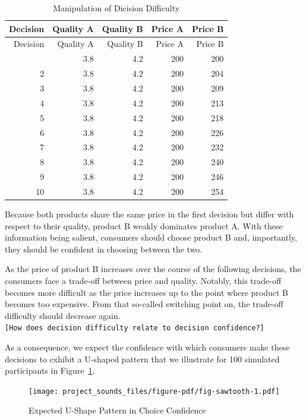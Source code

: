 \documentclass[
  a4paper,
]{scrreprt}
\begin{document}
\hypertarget{tbl-stimuli}{}
\begin{longtable}[]{@{}rrrrr@{}}
\caption{\label{tbl-stimuli}Manipulation of Dicision
Difficulty}\tabularnewline
\toprule\noalign{}
Decision & Quality A & Quality B & Price A & Price B \\
\midrule\noalign{}
\endfirsthead
\toprule\noalign{}
Decision & Quality A & Quality B & Price A & Price B \\
\midrule\noalign{}
\endhead
\bottomrule\noalign{}
\endlastfoot
1 & 3.8 & 4.2 & 200 & 200 \\
2 & 3.8 & 4.2 & 200 & 204 \\
3 & 3.8 & 4.2 & 200 & 209 \\
4 & 3.8 & 4.2 & 200 & 213 \\
5 & 3.8 & 4.2 & 200 & 218 \\
6 & 3.8 & 4.2 & 200 & 226 \\
7 & 3.8 & 4.2 & 200 & 232 \\
8 & 3.8 & 4.2 & 200 & 240 \\
9 & 3.8 & 4.2 & 200 & 246 \\
10 & 3.8 & 4.2 & 200 & 254 \\
\end{longtable}

Because both products share the same price in the first decision but
differ with respect to their quality, product B weakly dominates product
A. With these information being salient, consumers should choose product
B and, importantly, they should be confident in choosing between the
two.

As the price of product B increases over the course of the following
decisions, the consumers face a trade-off between price and quality.
Notably, this trade-off becomes more difficult as the price increases up
to the point where product B becomes too expensive. From that so-called
switching point on, the trade-off difficulty should decrease again.
\texttt{{[}How\ does\ decision\ difficulty\ relate\ to\ decision\ confidence?{]}}

As a consequence, we expect the confidence with which consumers make
these decisions to exhibit a U-shaped pattern that we illustrate for 100
simulated participants in Figure~\ref{fig-sawtooth}.

\begin{figure}

{\centering \texttt{[image: project\_sounds\_files/figure-pdf/fig-sawtooth-1.pdf]}

}

\caption{\label{fig-sawtooth}Expected U-Shape Pattern in Choice
Confidence}

\end{figure}
\end{document}
